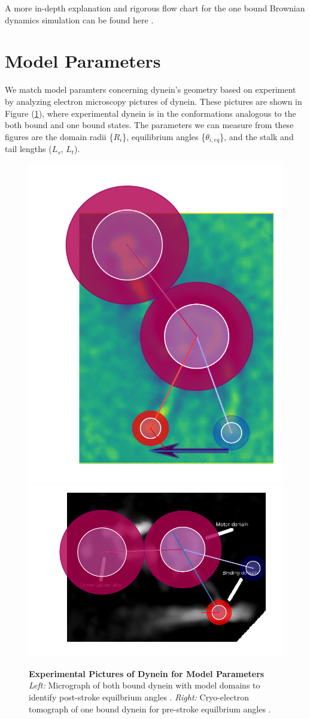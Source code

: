 A more in-depth explanation and rigorous flow chart for the one bound Brownian dynamics simulation can be found here \cite{Capek2017, }.


\section{Model Parameters}

We match model paramters concerning dynein's geometry based on experiment by analyzing electron microscopy pictures of dynein. These pictures are shown in Figure (\ref{fig:ParamsPics}), where experimental dynein is in the conformations analogous to the both bound and one bound states. The parameters we can measure from these figures are the domain radii \{$R_i$\}, equilibrium angles \{$\theta_{i,eq}$\}, and the stalk and tail lengths ($L_s$, $L_t$).  

\begin{figure}[hbt!]
	\centering
	\includegraphics[width=0.3\columnwidth]{../../plots/burgess-model-figure.pdf}
	\includegraphics[width=0.5\columnwidth]{../../plots/grotjahn-model-figure.pdf}%
	\caption[Experimental Pictures of Dynein for Model Parameters]{\textbf{Experimental Pictures of Dynein for Model Parameters} \textit{Left:} Micrograph of both bound dynein with model domains to identify post-stroke equilbrium angles \cite{Burgess2003}.  \textit{Right:} Cryo-electron tomograph of one bound dynein for pre-stroke equilbrium angles \cite{grotjahn2018cryo}.} 
	\label{fig:ParamsPics}
\end{figure}

